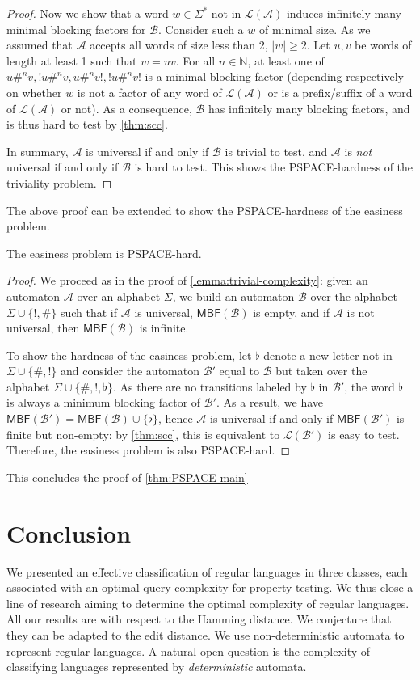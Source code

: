 \documentclass[letterpaper, USenglish, cleveref, autoref, thm-restate, numberwithinsect]{lipics-v2021}
\theoremstyle{theorem}
\theoremstyle{definition}
\newcommand{\Aa}{\mathcal{A}}
\newcommand{\Bb}{\mathcal{B}}
\newcommand{\lang}[1]{\mathcal{L}(#1)}
\newcommand{\MBF}{\textsf{MBF}\xspace}
\newcommand{\NN}{\mathbb{N}}
\newcommand{\PSPACE}{\textsf{PSPACE}\xspace}
\newcommand{\set}[1]{\{ #1 \}}
\begin{document}
\begin{proof}
	Now we show that a word $w \in \Sigma^*$ not in $\lang{\Aa}$ induces infinitely many minimal blocking factors for $\Bb$.
	Consider such a $w$ of minimal size. As we assumed that $\Aa$ accepts all words of size less than 2, $|w| \geq 2$. 
	Let $u, v$ be words of length at least 1 such that $w=uv$.
	For all $n \in \NN$, at least one of $u\#^nv, !u\#^nv, u\#^nv!, !u\#^nv!$ is a minimal blocking factor (depending respectively on whether $w$ is not a factor of any word of $\lang{\Aa}$ or is a prefix/suffix of a word of $\lang{\Aa}$ or not).
	As a consequence, $\Bb$ has infinitely many blocking factors, and is thus hard to test by \cref{thm:scc}.
	
	In summary, $\Aa$ is universal if and only if $\Bb$ is trivial to test, and  $\Aa$ is \emph{not} universal if and only if $\Bb$ is hard to test.
	This shows the \PSPACE-hardness of the triviality problem.
\end{proof}

The above proof can be extended to show the \PSPACE-hardness of the easiness problem.
\begin{corollary}\label{cor:hardness-easy}
	The easiness problem is \PSPACE-hard.
\end{corollary}
\begin{proof}
	We proceed as in the proof of \cref{lemma:trivial-complexity}: given an automaton $\Aa$ over an alphabet $\Sigma$,
	we build an automaton $\Bb$ over the alphabet $\Sigma\cup\set{!,\#}$ such that if $\Aa$ is universal,
	$\MBF(\Bb)$ is empty, and if $\Aa$ is not universal, then $\MBF(\Bb)$ is infinite.
	
	To show the hardness of the easiness problem, let $\flat$ denote a new letter not in $\Sigma \cup \set{\#, !}$ and consider the automaton $\Bb'$ equal to $\Bb$ but taken over the alphabet $\Sigma \cup \set{\#, !, \flat}$.
	As there are no transitions labeled by $\flat$ in $\Bb'$, the word $\flat$ is always a minimum blocking factor of $\Bb'$. As a result, we have $\MBF(\Bb') = \MBF(\Bb) \cup\set{\flat}$, hence $\Aa$ is universal if and only if $\MBF(\Bb')$ is finite but non-empty: by \cref{thm:scc}, this is equivalent to $\lang{\Bb'}$ is easy to test.
	Therefore, the easiness problem is also \PSPACE-hard.
\end{proof}

This concludes the proof of \cref{thm:PSPACE-main} 



\section{Conclusion}
We presented an effective classification of regular languages in three classes, each associated with an optimal query complexity for property testing.
We thus close a line of research aiming to determine the optimal complexity of regular languages.
All our results are with respect to the Hamming distance. We conjecture that they can be adapted to the edit distance.
We use non-deterministic automata to represent regular languages. 
A natural open question is the complexity of classifying languages represented by \emph{deterministic} automata.




\newpage
\end{document}
